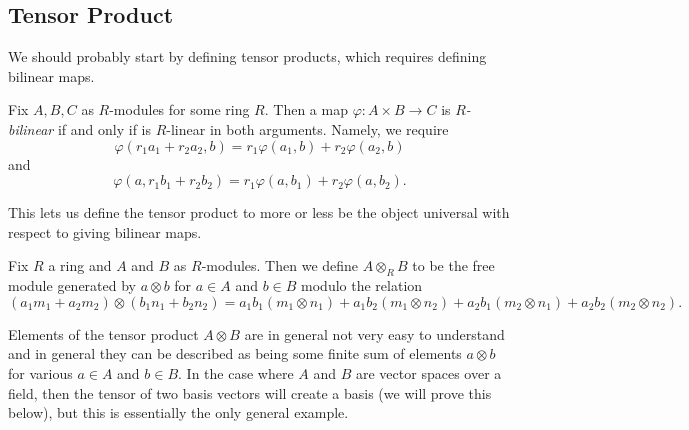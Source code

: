 \documentclass[../notes.tex]{subfiles}
\begin{document}
\subsection{Tensor Product}
We should probably start by defining tensor products, which requires defining bilinear maps.
\begin{definition}[Bilinear]
	Fix $A,B,C$ as $R$-modules for some ring $R$. Then a map $\varphi:A\times B\to C$ is \textit{$R$-bilinear} if and only if is $R$-linear in both arguments. Namely, we require
	\[\varphi(r_1a_1+r_2a_2,b)=r_1\varphi(a_1,b)+r_2\varphi(a_2,b)\]
	and
	\[\varphi(a,r_1b_1+r_2b_2)=r_1\varphi(a,b_1)+r_2\varphi(a,b_2).\]
\end{definition}
This lets us define the tensor product to more or less be the object universal with respect to giving bilinear maps.
\begin{definition}
	Fix $R$ a ring and $A$ and $B$ as $R$-modules. Then we define $A\otimes_RB$ to be the free module generated by $a\otimes b$ for $a\in A$ and $b\in B$ modulo the relation
	\[(a_1m_1+a_2m_2)\otimes(b_1n_1+b_2n_2)=a_1b_1(m_1\otimes n_1)+a_1b_2(m_1\otimes n_2)+a_2b_1(m_2\otimes n_1)+a_2b_2(m_2\otimes n_2).\]
\end{definition}
Elements of the tensor product $A\otimes B$ are in general not very easy to understand and in general they can be described as being some finite sum of elements $a\otimes b$ for various $a\in A$ and $b\in B$. In the case where $A$ and $B$ are vector spaces over a field, then the tensor of two basis vectors will create a basis (we will prove this below), but this is essentially the only general example.
\end{document}
